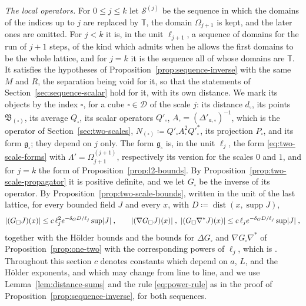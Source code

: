 \documentclass[11pt]{preprint}
\newcommand{\dist}{\operatorname{dist}}
\DeclarePairedDelimiter{\abs}{\lvert}{\rvert}
\numberwithin{equation}{section}
\theoremstyle{definition}
\theoremstyle{remark}
\theoremstyle{plain}
\begin{document}
\emph{The local operators.} For $0 \leq j \leq k$ let $\mathcal S^{(j)}$ be the sequence in which the domains of the indices up to $j$ are replaced by $\mathbb T$, the domain $\Omega_{j+1}$ is kept, and the later ones are omitted. For $j < k$ it is, in the unit $\ell_{j+1}$, a sequence of domains for the run of $j + 1$ steps, of the kind which \cite[p.~224]{BalabanPRT2} admits when he allows the first domains to be the whole lattice, and for $j = k$ it is the sequence all of whose domains are $\mathbb T$. It satisfies the hypotheses of Proposition~\ref{prop:sequence-inverse} with the same $M$ and $R$, the separation \cite[(2.2)]{BalabanPRT2} being void for it, so that the statements of Section~\ref{sec:sequence-scalar} hold for it, with its own distance. We mark its objects by the index $\square$, for a cube $\square \in \mathscr D$ of the scale $j$: its distance $d_\square$, its points $\mathfrak B_{(\square)}$, its average $Q_\square$, its scalar operators $Q'_\square$, $A_\square = (\Delta'_{a,\square})^{-1}$, which is the operator of Section~\ref{sec:two-scales}, $N_{(\square)} \coloneqq Q'_\square A_\square^2Q'^*_\square$, its projection $P_\square$, and its form $\mathfrak g_\square$; they depend on $j$ only. The form $\mathfrak g_\square$ is, in the unit $\ell_j$, the form \eqref{eq:two-scale-forms} with $\Lambda' = \Omega^{(j+1)}_{j+1}$, respectively its version for the scales $0$ and $1$, and for $j = k$ the form of Proposition~\ref{prop:l2-bounds}. By Proposition~\ref{prop:two-scale-propagator} it is positive definite, and we let $G_\square$ be the inverse of its operator. By Proposition~\ref{prop:two-scale-bounds}, written in the unit of the last lattice, for every bounded field $J$ and every $x$, with $D \coloneqq \dist(x, \operatorname{supp}J)$,
\begin{equation}\label{eq:local-propagator-bounds}
    \abs{(G_\square J)(x)} \leq c\,\ell_j^2e^{-\delta_GD/\ell_j}\sup\abs J\;,
    \qquad
    \abs{(\nabla G_\square J)(x)}\;,\ \abs{(G_\square\nabla^*J)(x)} \leq c\,\ell_je^{-\delta_GD/\ell_j}\sup\abs J\;,
\end{equation}
together with the H\"older bounds and the bounds for $\Delta G_\square$ and $\nabla G_\square\nabla^*$ of Proposition~\ref{prop:one-two} with the corresponding powers of $\ell_j$, which is \cite[(2.133)]{BalabanPRT2}. Throughout this section $c$ denotes constants which depend on $a$, $L$, and the H\"older exponents, and which may change from line to line, and we use Lemma~\ref{lem:distance-sums} and the rule \eqref{eq:power-rule} as in the proof of Proposition~\ref{prop:sequence-inverse}, for both sequences.
\end{document}
